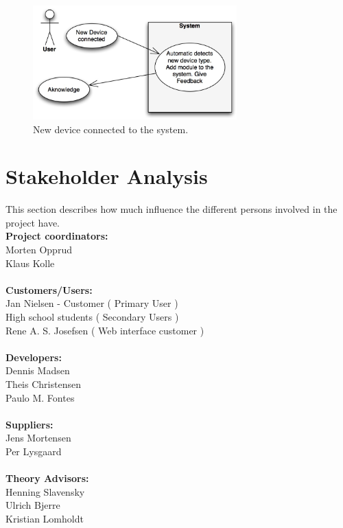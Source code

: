 \begin{figure}[H]
	\begin{centering}
		\includegraphics[width=0.7\textwidth]{images/usecases2.jpg}
		\caption{New device connected to the system. }
	\end{centering}
\end{figure}


\section{Stakeholder Analysis}
This section describes how much influence the different persons
involved in the project have.\\[0.2cm]
\textbf{Project coordinators:}\\ Morten Opprud\\ Klaus Kolle\\
\\
\textbf{Customers/Users:}\\
Jan Nielsen - Customer ( Primary User )\\
High school students ( Secondary Users )\\
Rene A. S. Josefsen ( Web interface customer )\\
\\
\textbf{Developers:}\\
Dennis Madsen\\
Theis Christensen\\
Paulo M. Fontes\\
\\
\textbf{Suppliers:}\\
Jens Mortensen\\
Per Lysgaard\\
\\
\textbf{Theory Advisors:}\\
Henning Slavensky\\
Ulrich Bjerre\\
Kristian Lomholdt\\

